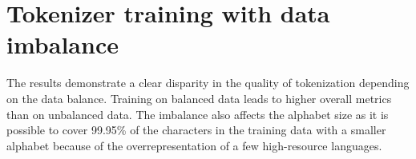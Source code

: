 \section{Tokenizer training with data imbalance}
\label{sec:tokenizer_training_with_data_imbalance}






The results demonstrate a clear disparity in the quality of tokenization depending on the data balance. Training on balanced data leads to higher overall metrics than on unbalanced data. The imbalance also affects the alphabet size as it is possible to cover 99.95\% of the characters in the training data with a smaller alphabet because of the overrepresentation of a few high-resource languages.

